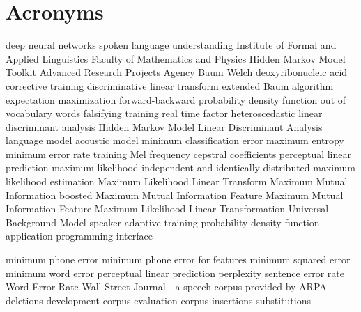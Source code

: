 \chapter{Acronyms}
\label{cha:acronyms}

\begin{acronym}[TDMA]
     {deep neural networks}
     {spoken language understanding}
     {Institute of Formal and Applied Linguistics}
     {Faculty of Mathematics and Physics}
     {Hidden Markov Model Toolkit}
     {Advanced Research Projects Agency}
     {Baum Welch}
     {deoxyribonucleic acid}
     {corrective training}
     {discriminative linear transform}
     {extended Baum algorithm}
     {expectation maximization}
     {forward-backward}
     {probability density function}
     {out of vocabulary words}
     {falsifying training}
     {real time factor}
     {heteroscedastic linear discriminant analysis}
     {Hidden Markov Model}
     {Linear Discriminant Analysis}
     {language model}
     {acoustic model}
     {minimum classification error}
     {maximum entropy}
     {minimum error rate training}
     {Mel frequency cepstral coefficients}
     {perceptual linear prediction}
     {maximum likelihood}
     {independent and identically distributed}
     {maximum likelihood estimation}
     {Maximum Likelihood Linear Transform}
     {Maximum Mutual Information}
     {boosted Maximum Mutual Information}
     {Feature Maximum Mutual Information}
     {Feature Maximum Likelihood Linear Transformation}
     {Universal Background Model}
     {speaker adaptive training}
     {probability density function}
     {application programming interface}

     {minimum phone error}
     {minimum phone error for features}
     {minimum squared error}
     {minimum word error}
     {perceptual linear prediction}
     {perplexity}
     {sentence error rate}
     {Word Error Rate}
     {Wall Street Journal - a speech corpus provided by ARPA}
     {deletions}
     {development corpus}
     {evaluation corpus}
     {insertions}
     {substitutions}
\end{acronym}

